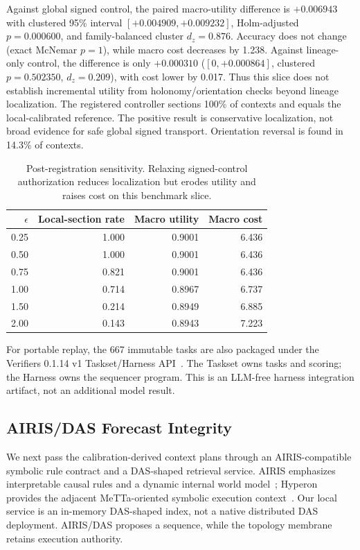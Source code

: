 \documentclass[11pt]{article}
\begin{document}
Against global signed control, the paired macro-utility difference is $+0.006943$ with clustered 95\% interval
$[+0.004909,+0.009232]$, Holm-adjusted $p=0.000600$, and family-balanced cluster $d_z=0.876$. Accuracy does not
change (exact McNemar $p=1$), while macro cost decreases by 1.238. Against lineage-only control, the difference
is only $+0.000310$ ($[0,+0.000864]$, clustered $p=0.502350$, $d_z=0.209$), with cost lower by 0.017. Thus this
slice does not establish incremental utility from holonomy/orientation checks beyond lineage localization. The
registered controller sections 100\% of contexts and equals the local-calibrated reference. The positive result
is conservative localization, not broad evidence for safe global signed transport. Orientation reversal is
found in 14.3\% of contexts.

\begin{table}[t]
\centering
\begin{tabular}{rrrr}
\toprule
$\epsilon$ & Local-section rate & Macro utility & Macro cost \\
\midrule
0.25 & 1.000 & 0.9001 & 6.436 \\
0.50 & 1.000 & 0.9001 & 6.436 \\
0.75 & 0.821 & 0.9001 & 6.436 \\
1.00 & 0.714 & 0.8967 & 6.737 \\
1.50 & 0.214 & 0.8949 & 6.885 \\
2.00 & 0.143 & 0.8943 & 7.223 \\
\bottomrule
\end{tabular}
\caption{Post-registration sensitivity. Relaxing signed-control authorization reduces localization but erodes
utility and raises cost on this benchmark slice.}
\label{tab:sequencer-sensitivity}
\end{table}

For portable replay, the 667 immutable tasks are also packaged under the Verifiers 0.1.14 v1
Taskset/Harness API~\cite{primeintellect2026verifiers}. The Taskset owns tasks and scoring; the Harness owns the
sequencer program. This is an LLM-free harness integration artifact, not an additional model result.

\subsection{AIRIS/DAS Forecast Integrity}

We next pass the calibration-derived context plans through an AIRIS-compatible symbolic rule contract and a
DAS-shaped retrieval service. AIRIS emphasizes interpretable causal rules and a dynamic internal world
model~\cite{airis2026}; Hyperon provides the adjacent MeTTa-oriented symbolic execution context~\cite{hyperon2026}.
Our local service is an in-memory DAS-shaped index, not a native distributed DAS deployment. AIRIS/DAS proposes
a sequence, while the topology membrane retains execution authority.
\end{document}
